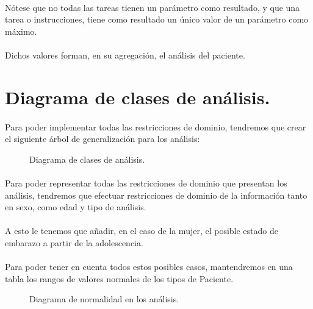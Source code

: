 \documentclass[a4paper,10pt]{article}
\begin{document}
\paragraph{}
Nótese que no todas las tareas tienen un parámetro como resultado, y que una tarea o instrucciones, tiene como resultado un único valor de un parámetro como máximo.

\paragraph{}
Dichos valores forman, en su agregación, el análisis del paciente.

\pagebreak

\section{Diagrama de clases de análisis.}
\paragraph{}
Para poder implementar todas las restricciones de dominio, tendremos que crear el siguiente árbol de generalización para los análisis:\\
\begin{figure}[hbt]
\scalebox{0.39}{}
\caption{Diagrama de clases de análisis.}
\label{fig:diagramaanalisis}
\end{figure}
\paragraph{}
Para poder representar todas las restricciones de dominio que presentan los análisis, tendremos que efectuar restricciones de dominio de la información tanto en sexo, como edad y tipo de análisis.
\paragraph{}
A esto le tenemos que añadir, en el caso de la mujer, el posible estado de embarazo a partir de la adolescencia.
\paragraph{}
Para poder tener en cuenta todos estos posibles casos, mantendremos en una tabla los rangos de valores normales de los tipos de Paciente.\\
\begin{figure}[hbt]
\begin{center}
\scalebox{0.8}{}
\end{center}
\caption{Diagrama de normalidad en los análisis.}
\label{fig:clases_analisis_normales}
\end{figure}
\end{document}
